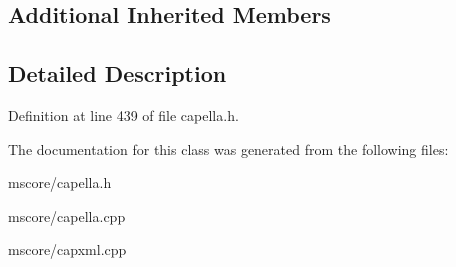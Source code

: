 \subsection*{Additional Inherited Members}


\subsection{Detailed Description}


Definition at line 439 of file capella.\+h.



The documentation for this class was generated from the following files\+:\begin{DoxyCompactItemize}
\item 
mscore/capella.\+h\item 
mscore/capella.\+cpp\item 
mscore/capxml.\+cpp\end{DoxyCompactItemize}
